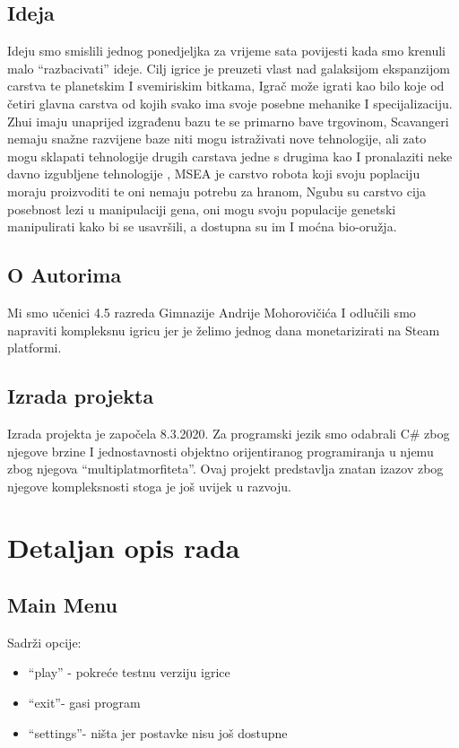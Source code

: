 \documentclass[12pt]{article}
\begin{document}
	\subsection{Ideja}
	Ideju smo smislili jednog ponedjeljka za vrijeme sata povijesti kada smo krenuli malo “razbacivati” ideje. Cilj igrice je preuzeti vlast nad galaksijom ekspanzijom carstva te planetskim I svemiriskim bitkama, Igrač može igrati kao bilo koje od četiri glavna carstva od kojih svako ima svoje posebne mehanike I specijalizaciju. Zhui imaju unaprijed izgrađenu bazu te se primarno bave trgovinom, Scavangeri nemaju snažne razvijene baze niti mogu istraživati nove tehnologije, ali zato mogu sklapati tehnologije drugih carstava jedne s drugima kao I pronalaziti neke davno izgubljene tehnologije , MSEA je carstvo robota koji svoju poplaciju moraju proizvoditi te oni nemaju potrebu za hranom, Ngubu su carstvo cija posebnost lezi u manipulaciji gena, oni mogu svoju populacije genetski manipulirati kako bi se usavršili, a dostupna su im I moćna bio-oružja.
	
	\subsection{O Autorima}
	Mi smo učenici 4.5 razreda Gimnazije Andrije Mohorovičića I odlučili smo napraviti kompleksnu igricu jer je želimo jednog dana monetarizirati na Steam platformi.
	
	\subsection{Izrada projekta}
	Izrada projekta je započela 8.3.2020.
	Za programski jezik smo odabrali C\# zbog njegove brzine I jednostavnosti objektno orijentiranog programiranja u njemu zbog njegova “multiplatmorfiteta”.
	Ovaj projekt predstavlja znatan izazov zbog njegove kompleksnosti stoga je još uvijek u razvoju.
	
	
		\clearpage
	\section{Detaljan opis rada}
	
	\subsection{Main Menu}
		Sadrži opcije:
	\begin{itemize}
		\item	“play” - pokreće testnu verziju igrice
		\item	“exit”- gasi program
		\item	“settings”- ništa jer postavke nisu još dostupne
	\end{itemize}
\end{document}
